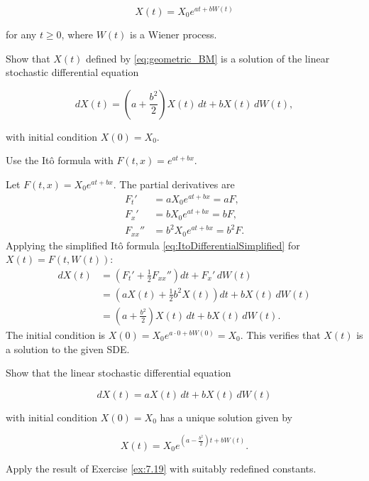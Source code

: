 \begin{equation}
X(t) = X_0 e^{at + bW(t)}
\label{eq:geometric_BM}
\end{equation}

for any $t \geq 0$, where $W(t)$ is a Wiener process.

\begin{Exercise}
\label{ex:7.19}
Show that $X(t)$ defined by \eqref{eq:geometric_BM} is a solution of the linear stochastic differential equation

\begin{equation}
dX(t) = \left(a + \frac{b^2}{2}\right) X(t) \, dt + b X(t) \, dW(t),
\label{eq:SDE_for_geometric_BM}
\end{equation}

with initial condition $X(0) = X_0$.

\begin{hint}
Use the Itô formula with $F(t, x) = e^{at + bx}$.
\end{hint}
\end{Exercise}

\begin{Solution}
Let $F(t, x) = X_0 e^{at + bx}$. The partial derivatives are
\begin{align*}
F_t' &= a X_0 e^{at + bx} = a F, \\
F_x' &= b X_0 e^{at + bx} = b F, \\
F_{xx}'' &= b^2 X_0 e^{at + bx} = b^2 F.
\end{align*}
Applying the simplified Itô formula \eqref{eq:ItoDifferentialSimplified} for $X(t) = F(t, W(t))$:
\begin{align*}
dX(t) &= \left( F_t' + \frac{1}{2} F_{xx}'' \right) dt + F_x' \, dW(t) \\
&= \left( a X(t) + \frac{1}{2} b^2 X(t) \right) dt + b X(t) \, dW(t) \\
&= \left( a + \frac{b^2}{2} \right) X(t) \, dt + b X(t) \, dW(t).
\end{align*}
The initial condition is $X(0) = X_0 e^{a \cdot 0 + b W(0)} = X_0$. This verifies that $X(t)$ is a solution to the given SDE.
\end{Solution}

\begin{Exercise}
\label{ex:7.20}
Show that the linear stochastic differential equation

\begin{equation}
dX(t) = a X(t) \, dt + b X(t) \, dW(t)
\end{equation}

with initial condition $X(0) = X_0$ has a unique solution given by

\begin{equation}
X(t) = X_0 e^{\left(a - \frac{b^2}{2}\right) t + b W(t)}.
\end{equation}

\begin{hint}
Apply the result of Exercise \ref{ex:7.19} with suitably redefined constants.
\end{hint}
\end{Exercise}

